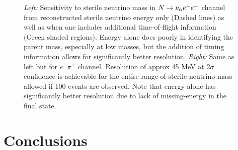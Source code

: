 \documentclass[11pt, a4paper]{article}
\def\ster{\ensuremath N}
\begin{document}
\begin{figure}[t]
\caption{\label{fig:tof_scatter}
	\emph{Left:} Sensitivity to sterile neutrino mass in $\ster \rightarrow
\nu_\alpha e^+ e^-$ channel from reconstructed sterile neutrino energy only (Dashed
lines) as well as when one includes additional time-of-flight information
(Green shaded regions).  Energy alone does poorly in identifying the parent
mass, especially at low masses, but the addition of timing information allows
for significantly better resolution.  \emph{Right:} Same as left but for $e^-
\pi^+$ channel. Resolution of approx 45 MeV at 2$\sigma$ confidence is
achievable for the entire range of sterile neutrino mass allowed if 100 events are
observed. Note that energy alone has significantly better resolution due to
lack of missing-energy in the final state.}
\end{figure}


\section{\label{sec:conclusions}Conclusions}
\end{document}
